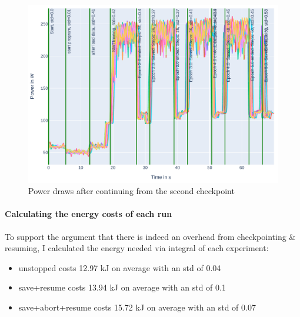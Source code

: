 \begin{figure}
    \includegraphics[width=\linewidth]{power-measurements/stacked_plots/roberta_continue_after_not_saving.pdf}
    \caption{Power draws after continuing from the second checkpoint}
    \label{fig:plot_partial_abort_continue_stacked}
\end{figure}

\paragraph{Calculating the energy costs of each run}

To support the argument that there is indeed an overhead from checkpointing \& resuming, I calculated the energy needed via integral of each experiment:

\begin{itemize}
    \item  unstopped costs 12.97 kJ on average with an std of 0.04
    \item  save+resume costs 13.94 kJ on average with an std of 0.1
    \item  save+abort+resume costs 15.72 kJ on average with an std of 0.07
\end{itemize}